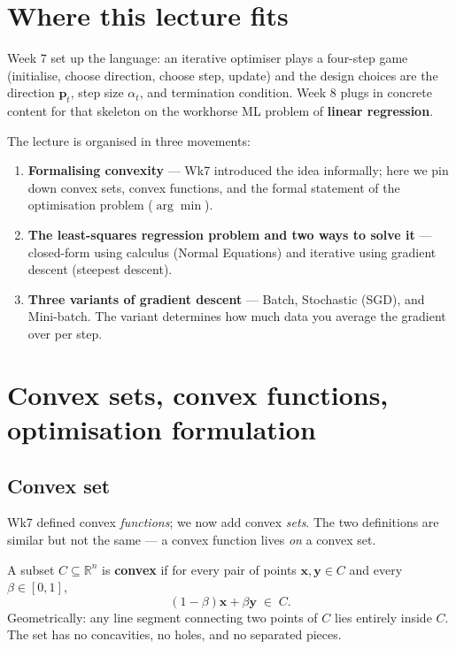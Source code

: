 \documentclass[11pt, a4paper]{article}
\begin{document}
\section{Where this lecture fits}

Week 7 set up the language: an iterative optimiser plays a four-step game (initialise, choose direction, choose step, update) and the design choices are the direction $\mathbf{p}_t$, step size $\alpha_t$, and termination condition. Week 8 plugs in concrete content for that skeleton on the workhorse ML problem of \textbf{linear regression}.

The lecture is organised in three movements:

\begin{enumerate}
  \item \textbf{Formalising convexity} — Wk7 introduced the idea informally; here we pin down convex sets, convex functions, and the formal statement of the optimisation problem ($\arg\min$).
  \item \textbf{The least-squares regression problem and two ways to solve it} — closed-form using calculus (Normal Equations) and iterative using gradient descent (steepest descent).
  \item \textbf{Three variants of gradient descent} — Batch, Stochastic (SGD), and Mini-batch. The variant determines how much data you average the gradient over per step.
\end{enumerate}

\section{Convex sets, convex functions, optimisation formulation}

\subsection{Convex set}

Wk7 defined convex \emph{functions}; we now add convex \emph{sets}. The two definitions are similar but not the same — a convex function lives \emph{on} a convex set.

\begin{defbox}
A subset $C \subseteq \mathbb{R}^n$ is \textbf{convex} if for every pair of points $\mathbf{x}, \mathbf{y} \in C$ and every $\beta \in [0,1]$,
\[
(1-\beta)\mathbf{x} + \beta\mathbf{y} \;\in\; C.
\]
Geometrically: any line segment connecting two points of $C$ lies entirely inside $C$. The set has no concavities, no holes, and no separated pieces.
\end{defbox}
\end{document}
